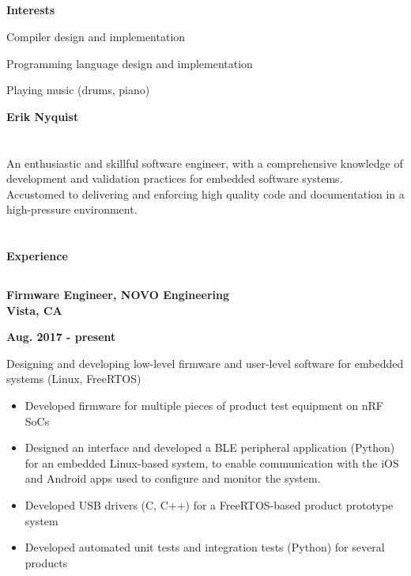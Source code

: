 \documentclass[6pt]{article}
\begin{document}
\begin{minipage}{15em}
\subsection*{}
{\textbf{Interests}}

\noindent
\begin{itemize}
{\small \raggedright
    \item Compiler design and implementation
    \item Programming language design and implementation
    \item Playing music (drums, piano)
}
\end{itemize}
\end{minipage}
%
%
\begin{minipage}{35em}
%
%
{\Huge \bfseries Erik Nyquist}
\section*{}

An enthusiastic and skillful software engineer, with a comprehensive knowledge of
development and validation practices for embedded software systems. Accustomed to
delivering and enforcing high quality code and documentation in a high-pressure
environment.

\section*{}
{\Large \bfseries Experience}
%
%
\subsection*{}
\hspace*{-\parindent}%
\begin{minipage}{20em}
{\bfseries Firmware Engineer, NOVO Engineering \\
Vista, CA}
\end{minipage}
\hfill
\begin{minipage}{10em}
{
    \bfseries \hfill Aug. 2017 - present \\

}
\end{minipage}
\break
\break
Designing and developing low-level firmware and user-level software for embedded
systems (Linux, FreeRTOS)
\begin{itemize}
    \item Developed firmware for multiple pieces of product test equipment on nRF SoCs
    \item Designed an interface and developed a BLE peripheral application (Python) for an
          embedded Linux-based system, to enable communication with the iOS and Android
          apps used to configure and monitor the system.
    \item Developed USB drivers (C, C++) for a FreeRTOS-based product prototype system
    \item Developed automated unit tests and integration tests (Python) for several products
\end{itemize}
\hspace*{-\parindent}%
\begin{minipage}{20em}
%
%

\end{minipage}
\end{minipage}
\end{document}
